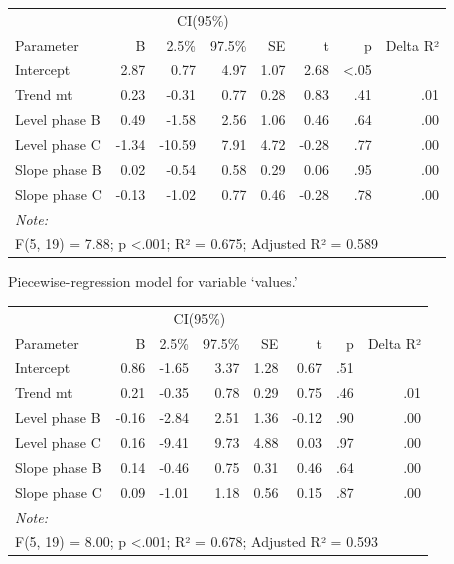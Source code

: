 \documentclass[
]{book}
\begin{document}
\begin{table}
\centering
\begin{tabular}{lrrrrrrr}
\toprule
\multicolumn{2}{c}{ } & \multicolumn{2}{c}{CI(95\%)} & \multicolumn{4}{c}{ } \\
\cmidrule(l{3pt}r{3pt}){3-4}
Parameter & B & 2.5\% & 97.5\% & SE & t & p & Delta R²\\
\midrule
Intercept & 2.87 & 0.77 & 4.97 & 1.07 & 2.68 & <.05 & \\
Trend mt & 0.23 & -0.31 & 0.77 & 0.28 & 0.83 & .41 & .01\\
Level phase B & 0.49 & -1.58 & 2.56 & 1.06 & 0.46 & .64 & .00\\
Level phase C & -1.34 & -10.59 & 7.91 & 4.72 & -0.28 & .77 & .00\\
Slope phase B & 0.02 & -0.54 & 0.58 & 0.29 & 0.06 & .95 & .00\\
\addlinespace
Slope phase C & -0.13 & -1.02 & 0.77 & 0.46 & -0.28 & .78 & .00\\
\bottomrule
\multicolumn{8}{l}{\rule{0pt}{1em}\textit{Note: }}\\
\multicolumn{8}{l}{\rule{0pt}{1em}F(5, 19) = 7.88; p <.001; R² = 0.675; Adjusted R² = 0.589}\\
\end{tabular}
\end{table}

Piecewise-regression model for variable `values.'

\begin{table}
\centering
\begin{tabular}{lrrrrrrr}
\toprule
\multicolumn{2}{c}{ } & \multicolumn{2}{c}{CI(95\%)} & \multicolumn{4}{c}{ } \\
\cmidrule(l{3pt}r{3pt}){3-4}
Parameter & B & 2.5\% & 97.5\% & SE & t & p & Delta R²\\
\midrule
Intercept & 0.86 & -1.65 & 3.37 & 1.28 & 0.67 & .51 & \\
Trend mt & 0.21 & -0.35 & 0.78 & 0.29 & 0.75 & .46 & .01\\
Level phase B & -0.16 & -2.84 & 2.51 & 1.36 & -0.12 & .90 & .00\\
Level phase C & 0.16 & -9.41 & 9.73 & 4.88 & 0.03 & .97 & .00\\
Slope phase B & 0.14 & -0.46 & 0.75 & 0.31 & 0.46 & .64 & .00\\
\addlinespace
Slope phase C & 0.09 & -1.01 & 1.18 & 0.56 & 0.15 & .87 & .00\\
\bottomrule
\multicolumn{8}{l}{\rule{0pt}{1em}\textit{Note: }}\\
\multicolumn{8}{l}{\rule{0pt}{1em}F(5, 19) = 8.00; p <.001; R² = 0.678; Adjusted R² = 0.593}\\
\end{tabular}
\end{table}
\end{document}

